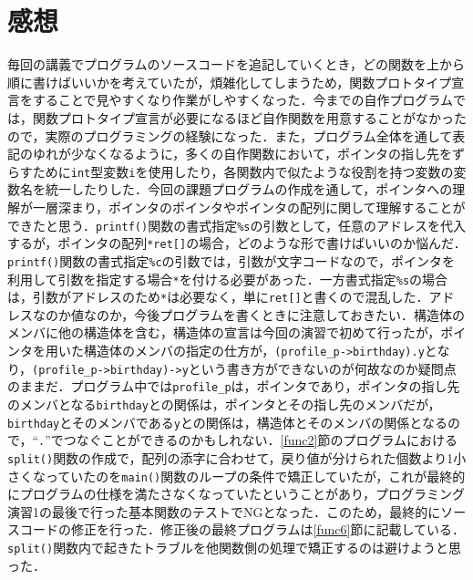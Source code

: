 \section{感想}\label{sec:review}

毎回の講義でプログラムのソースコードを追記していくとき，どの関数を上から順に書けばいいかを考えていたが，煩雑化してしまうため，関数プロトタイプ宣言をすることで見やすくなり作業がしやすくなった\cite{book:meikai}．今までの自作プログラムでは，関数プロトタイプ宣言が必要になるほど自作関数を用意することがなかったので，実際のプログラミングの経験になった．また，プログラム全体を通して表記のゆれが少なくなるように，多くの自作関数において，ポインタの指し先をずらすために\verb|int|型変数\verb|i|を使用したり，各関数内で似たような役割を持つ変数の変数名を統一したりした．今回の課題プログラムの作成を通して，ポインタへの理解が一層深まり，ポインタのポインタやポインタの配列に関して理解することができたと思う\cite{www:label3,www:label4}．\verb|printf()|関数の書式指定\verb|%s|の引数として，任意のアドレスを代入するが，ポインタの配列\verb|*ret[]|の場合，どのような形で書けばいいのか悩んだ．\verb|printf()|関数の書式指定\verb|%c|の引数では，引数が文字コードなので，ポインタを利用して引数を指定する場合\verb|*|を付ける必要があった．一方書式指定\verb|%s|の場合は，引数がアドレスのため\verb|*|は必要なく，単に\verb|ret[]|と書くので混乱した．アドレスなのか値なのか，今後プログラムを書くときに注意しておきたい．構造体のメンバに他の構造体を含む，構造体の宣言は今回の演習で初めて行ったが，ポインタを用いた構造体のメンバの指定の仕方が，\verb|(profile_p->birthday).y|となり，\verb|(profile_p->birthday)->y|という書き方ができないのが何故なのか疑問点のままだ．プログラム中では\verb|profile_p|は，ポインタであり，ポインタの指し先のメンバとなる\verb|birthday|との関係は，ポインタとその指し先のメンバだが，\verb|birthday|とそのメンバである\verb|y|との関係は，構造体とそのメンバの関係となるので，“\verb|.|”でつなぐことができるのかもしれない．\ref{func2}節のプログラムにおける\verb|split()|関数の作成で，配列の添字に合わせて，戻り値が分けられた個数より1小さくなっていたのを\verb|main()|関数のループの条件で矯正していたが，これが最終的にプログラムの仕様を満たさなくなっていたということがあり，プログラミング演習1の最後で行った基本関数のテストでNGとなった．このため，最終的にソースコードの修正を行った．修正後の最終プログラムは\ref{func6}節に記載している．\verb|split()|関数内で起きたトラブルを他関数側の処理で矯正するのは避けようと思った．

